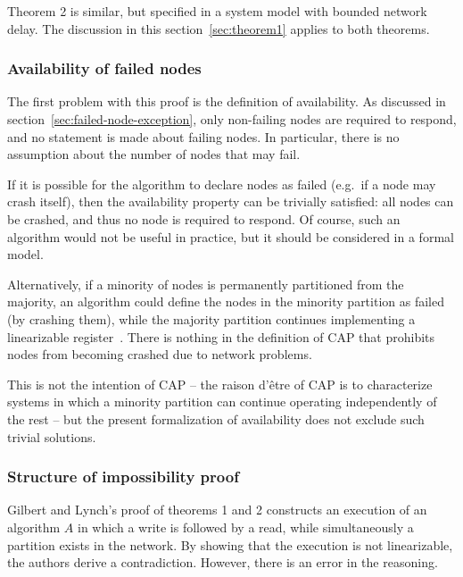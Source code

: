 \documentclass[a4paper,twocolumn,10pt]{article}
\begin{document}
Theorem 2 is similar, but specified in a system model with bounded network delay. The discussion in
this section~\ref{sec:theorem1} applies to both theorems.

\subsubsection{Availability of failed nodes}\label{sec:failed-node-trivial}

The first problem with this proof is the definition of availability. As discussed in
section~\ref{sec:failed-node-exception}, only non-failing nodes are required to respond, and no
statement is made about failing nodes. In particular, there is no assumption about the number of
nodes that may fail.

If it is possible for the algorithm to declare nodes as failed (e.g.\ if a node may crash itself),
then the availability property can be trivially satisfied: all nodes can be crashed, and thus no
node is required to respond. Of course, such an algorithm would not be useful in practice, but it
should be considered in a formal model.

Alternatively, if a minority of nodes is permanently partitioned from the majority, an algorithm
could define the nodes in the minority partition as failed (by crashing them), while the majority
partition continues implementing a linearizable register~\cite{Attiya1995bm}. There is nothing in
the definition of CAP that prohibits nodes from becoming crashed due to network problems.

This is not the intention of CAP -- the raison d'\^{e}tre of CAP is to characterize systems in which
a minority partition can continue operating independently of the rest -- but the present
formalization of availability does not exclude such trivial solutions.

\subsubsection{Structure of impossibility proof}

Gilbert and Lynch's proof of theorems 1 and 2 constructs an execution of an algorithm $A$ in which a
write is followed by a read, while simultaneously a partition exists in the network. By showing that
the execution is not linearizable, the authors derive a contradiction. However, there is an error in
the reasoning.
\end{document}

